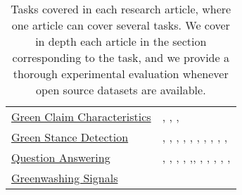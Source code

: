 \begin{table}[H]
\begin{tabular}{p{5cm}|p{10cm}}
   \hyperref[sec: claim characteristics]{Green Claim Characteristics} & \citet{bingler2023cheaptalkspecificitysentiment}, \citet{schimanski_bridging_2023}, \citet{tobias_schimanski_climatebert-netzero_2023}, \citet{vinicius_woloszyn_towards_2021} \\
   \hyperref[sec:stance detection]{Green Stance Detection}&  \citet{diggelmann_climate-fever_2020}, \citet{Wang2021EvidenceBA}, \citet{morio2023an}, \citet{luo_detecting_2020}, \citet{vaid-etal-2022-towards}, \citet{lai_using_2023}, \citet{vaghefi2022deep}, \citet{xiang_dare_2023}, \citet{nicolas_webersinke_climatebert_2021}, \citet{spokoyny2023answering}, \citet{luo_detecting_2020} \\
  \hyperref[sec:qa]{Question Answering} &  \citet{luccioni_analyzing_2020}, \citet{coanComputerassistedClassificationContrarian2021}, \citet{cliamtebot_2022}, \citet{cliamtebot_2022}, \citet{cliamtebot_2022},\citet{spokoyny2023answering}, \citet{jingwei_ni_paradigm_2023}, \citet{s_vaghefi_chatclimate_2023}, \citet{mullappilly-etal-2023-arabic}, \citet{mullappilly-etal-2023-arabic}, \citet{spokoyny2023answering}, \citet{thulke2024climategpt}  \\ 
  \hyperref[sec: greenwashing signals]{Greenwashing Signals} & \\
  \hline
    \end{tabular}

    \caption{Tasks covered in each research article, where one article can cover several tasks. We cover in depth each article in the section corresponding to the task, and we provide a thorough experimental evaluation whenever open source datasets are available. }
    \label{tab:overview_papers}
\end{table}